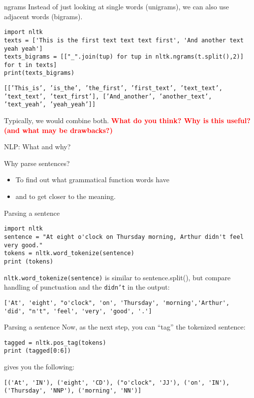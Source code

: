 \documentclass[compress]{beamer}
\begin{document}
\begin{frame}[fragile]{ngrams}
Instead of just looking at single words (unigrams), we can also use adjacent words (bigrams).
\begin{lstlisting}
import nltk
texts = ['This is the first text text text first', 'And another text yeah yeah']
texts_bigrams = [["_".join(tup) for tup in nltk.ngrams(t.split(),2)] for t in texts]
print(texts_bigrams)
\end{lstlisting}
\texttt{[['This\_is',
	'is\_the',
	'the\_first',
	'first\_text',
	'text\_text',
	'text\_text',
	'text\_first'],
	['And\_another', 'another\_text', 'text\_yeah', 'yeah\_yeah']]
}

Typically, we would combine both.
\pause
\textbf{\textcolor{red}{What do you think? Why is this useful? (and what may be drawbacks?)}}
\end{frame}



\begin{frame}{NLP: What and why?}
\begin{block}{Why parse sentences?}
\begin{itemize}
\item To find out what grammatical function words have
\item and to get closer to the meaning.
\end{itemize}
\end{block}
\end{frame}

\begin{frame}[fragile]{Parsing a sentence}
\begin{lstlisting}
import nltk
sentence = "At eight o'clock on Thursday morning, Arthur didn't feel very good."
tokens = nltk.word_tokenize(sentence)
print (tokens)
\end{lstlisting}

\texttt{nltk.word\_tokenize(sentence)} is similar to sentence.split(), but compare handling of punctuation and the \texttt{didn't} in the output:
\begin{lstlisting}
['At', 'eight', "o'clock", 'on', 'Thursday', 'morning','Arthur', 'did', "n't", 'feel', 'very', 'good', '.']
\end{lstlisting}
\end{frame}


\begin{frame}[fragile]{Parsing a sentence}
Now, as the next step, you can ``tag'' the tokenized sentence:
\begin{lstlisting}
tagged = nltk.pos_tag(tokens)
print (tagged[0:6])
\end{lstlisting}
gives you the following:
\begin{lstlisting}
[('At', 'IN'), ('eight', 'CD'), ("o'clock", 'JJ'), ('on', 'IN'),
('Thursday', 'NNP'), ('morning', 'NN')]
\end{lstlisting}


\end{frame}
\end{document}
